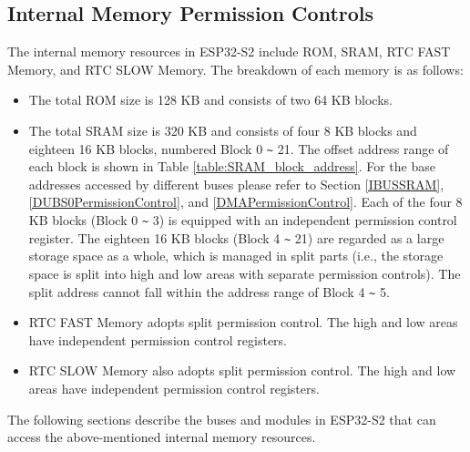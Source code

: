 \documentclass[main\_\_EN.tex]{subfiles}
\begin{document}
\subsection{Internal Memory Permission Controls}
The internal memory resources in ESP32-S2 include ROM, SRAM, RTC FAST Memory, and RTC SLOW Memory. The breakdown of each memory is as follows:
\begin{itemize}
    \item The total ROM size is 128 KB and consists of two 64 KB blocks.
    \item The total SRAM size is 320 KB and consists of four 8 KB blocks and eighteen 16 KB blocks, numbered Block 0 \verb+~+ 21. The offset address range of each block is shown in Table \ref{table:SRAM_block_address}. For the base addresses accessed by different buses please refer to Section \ref{IBUSSRAM}, \ref{DUBS0PermissionControl}, and \ref{DMAPermissionControl}. Each of the four 8 KB blocks (Block 0 \verb+~+ 3) is equipped with an independent permission control register. The eighteen 16 KB blocks (Block 4 \verb+~+ 21) are regarded as a large storage space as a whole, which is  managed  in split parts (i.e., the storage space is split into high and low areas with separate permission controls). The split address cannot fall within the address range of Block 4 \verb+~+ 5.
    \item RTC FAST Memory adopts split permission control. The high and low areas have independent permission control registers.
    \item RTC SLOW Memory also adopts split permission control. The high and low areas have independent permission control registers.
\end{itemize}

The following sections describe the buses and modules in ESP32-S2 that can access the above-mentioned internal memory resources.
\end{document}
